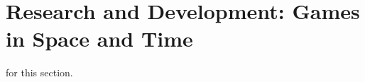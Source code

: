 \chapter[Research and Development: Games in Space and Time]{Research and Development: Games in Space and Time}
\label{ch:rd}


 for this section. \lipsum[4]

\lipsum[4]

\clearpage
\clearpage
\clearpage
\clearpage